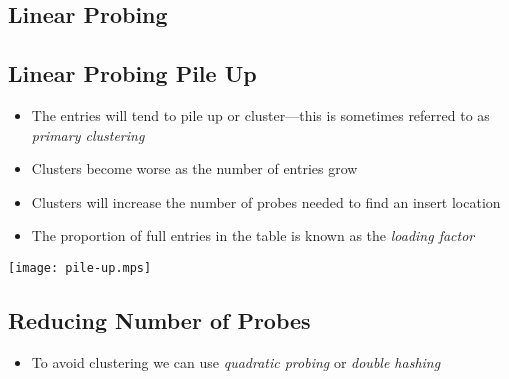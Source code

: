 \begin{slide}
\section{Linear Probing}

\pausebuild
\begin{center}
  \pause
\end{center}
\end{slide}


\begin{slide}
\section{Linear Probing Pile Up}

\begin{PauseHighLight}
  \begin{minipage}{16cm}
    \raggedright
  \begin{itemize}
  \item The entries will tend to pile up or cluster---this is sometimes
    referred to as \emph{primary clustering}\pause
  \item Clusters become worse as the number of entries grow\pause
  \item Clusters will increase the number of probes needed to find an
    insert location\pause
  \item The proportion of full entries in the table is known as the
    \emph{loading factor}\pause
  \end{itemize}
  \end{minipage}\hfill
  \begin{minipage}{7cm}
    \texttt{[image: pile-up.mps]}    
  \end{minipage}
\end{PauseHighLight}
\end{slide}


\begin{slide}
\section[-1]{Reducing Number of Probes}
\pb\pause{}
\begin{center}
  \pause
\end{center}
\begin{itemize}\small
\item To avoid clustering we can use \emph{quadratic probing}\pause{}
  or \emph{double hashing}\pause
\end{itemize}

\end{slide}



